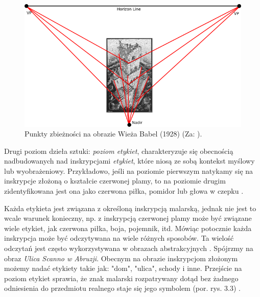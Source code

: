 \documentclass[licencjacka]{kdypl}
\begin{document}
\begin{figure}[H]
\includegraphics[width=\textwidth]{babelvps.png}
\centering
\caption{Punkty zbieżności na obrazie Wieża Babel (1928)  (Za: \citealt{EscherMath2006}).}
\end{figure}



Drugi poziom dzieła sztuki: \textit{poziom etykiet}, charakteryzuje się obecnością nadbudowanych nad inskrypcjami \textit{etykiet}, które niosą ze sobą kontekst myślowy lub wyobrażeniowy. Przykładowo, jeśli na poziomie pierwszym natykamy się na inskrypcje złożoną o kształcie czerwonej plamy, to na poziomie drugim zidentyfikowana jest ona jako czerwona piłka, pomidor lub głowa w czepku \citep[s. 391]{Florek2006}.

Każda etykieta jest związana z określoną inskrypcją malarską, jednak nie jest to wcale warunek konieczny, np. z inskrypcją czerwonej plamy może być związane wiele etykiet, jak czerwona piłka, boja, pojemnik, itd. Mówiąc potocznie każda inskrypcja może być odczytywana na wiele różnych sposobów. Ta wielość odczytań jest często wykorzystywana w obrazach abstrakcyjnych \citep[s. 392]{Florek2006}.
Spójrzmy na obraz \textit{Ulica Scanno w Abruzji}. Obecnym na obrazie inskrypcjom złożonym możemy nadać etykiety takie jak: "dom", "ulica", schody i inne. Przejście na poziom etykiet sprawia, że znak malarski rozpatrywany dotąd bez żadnego odniesienia do przedmiotu realnego staje się jego symbolem (por. rys. 3.3) \citep[s. 392]{Florek2006}.
\end{document}
